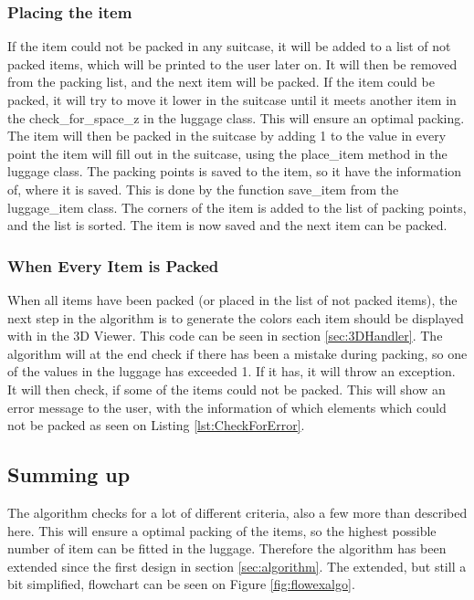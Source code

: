 \subsubsection{Placing the item}
If the item could not be packed in any suitcase, it will be added to a list of not packed items, which will be printed to the user later on. It will then be removed from the packing list, and the next item will be packed. If the item could be packed, it will try to move it lower in the suitcase until it meets another item in the check\_for\_space\_z in the luggage class. This will ensure an optimal packing. The item will then be packed in the suitcase by adding 1 to the value in every point the item will fill out in the suitcase, using the place\_item method in the luggage class. The packing points is saved to the item, so it have the information of, where it is saved. This is done by the function save\_item from the luggage\_item class. The corners of the item is added to the list of packing points, and the list is sorted. The item is now saved and the next item can be packed.
\subsubsection{When Every Item is Packed}
When all items have been packed (or placed in the list of not packed items), the next step in the algorithm is to generate the colors each item should be displayed with in the 3D Viewer. This code can be seen in section \ref{sec:3DHandler}.
The algorithm will at the end check if there has been a mistake during packing, so one of the values in the luggage has exceeded 1. If it has, it will throw an exception. It will then check, if some of the items could not be packed. This will show an error message to the user, with the information of which elements which could not be packed as seen on Listing \ref{lst:CheckForError}.

\subsection{Summing up}
The algorithm checks for a lot of different criteria, also a few more than described here. This will ensure a optimal packing of the items, so the highest possible number of item can be fitted in the luggage. Therefore the algorithm has been extended since the first design in section \ref{sec:algorithm}. The extended, but still a bit simplified, flowchart can be seen on Figure \ref{fig:flowexalgo}.

